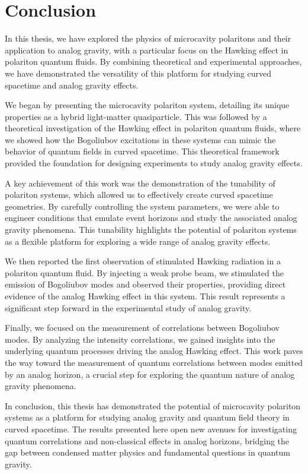 

\chapter{Conclusion}

In this thesis, we have explored the physics of microcavity polaritons and their application to analog gravity, with a particular focus on the Hawking effect in polariton quantum fluids. By combining theoretical and experimental approaches, we have demonstrated the versatility of this platform for studying curved spacetime and analog gravity effects.

We began by presenting the microcavity polariton system, detailing its unique properties as a hybrid light-matter quasiparticle. This was followed by a theoretical investigation of the Hawking effect in polariton quantum fluids, where we showed how the Bogoliubov excitations in these systems can mimic the behavior of quantum fields in curved spacetime. This theoretical framework provided the foundation for designing experiments to study analog gravity effects.

A key achievement of this work was the demonstration of the tunability of polariton systems, which allowed us to effectively create curved spacetime geometries. By carefully controlling the system parameters, we were able to engineer conditions that emulate event horizons and study the associated analog gravity phenomena. This tunability highlights the potential of polariton systems as a flexible platform for exploring a wide range of analog gravity effects.

We then reported the first observation of stimulated Hawking radiation in a polariton quantum fluid. By injecting a weak probe beam, we stimulated the emission of Bogoliubov modes and observed their properties, providing direct evidence of the analog Hawking effect in this system. This result represents a significant step forward in the experimental study of analog gravity.

Finally, we focused on the measurement of correlations between Bogoliubov modes. By analyzing the intensity correlations, we gained insights into the underlying quantum processes driving the analog Hawking effect. This work paves the way toward the measurement of quantum correlations between modes emitted by an analog horizon, a crucial step for exploring the quantum nature of analog gravity phenomena.

In conclusion, this thesis has demonstrated the potential of microcavity polariton systems as a platform for studying analog gravity and quantum field theory in curved spacetime. The results presented here open new avenues for investigating quantum correlations and non-classical effects in analog horizons, bridging the gap between condensed matter physics and fundamental questions in quantum gravity.